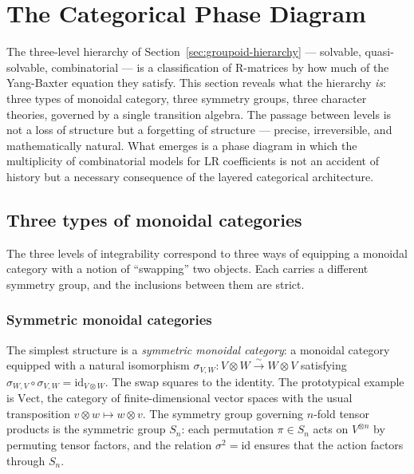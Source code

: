 
\section{The Categorical Phase Diagram}
\label{sec:hierarchy}

The three-level hierarchy of Section~\ref{sec:groupoid-hierarchy}
--- solvable, quasi-solvable, combinatorial --- is a classification
of R-matrices by how much of the Yang-Baxter equation they satisfy.
This section reveals what the hierarchy \emph{is}: three types of
monoidal category, three symmetry groups, three character theories,
governed by a single transition algebra.  The passage between levels
is not a loss of structure but a forgetting of structure --- precise,
irreversible, and mathematically natural.  What emerges is a phase
diagram in which the multiplicity of combinatorial models for LR
coefficients is not an accident of history but a necessary consequence
of the layered categorical architecture.


\subsection{Three types of monoidal categories}
\label{sec:hierarchy-monoidal}

The three levels of integrability correspond to three ways of equipping
a monoidal category with a notion of ``swapping'' two objects.
Each carries a different symmetry group, and the inclusions between
them are strict.

\subsubsection*{Symmetric monoidal categories}

The simplest structure is a \emph{symmetric monoidal category}: a
monoidal category equipped with a natural isomorphism
$\sigma_{V,W} \colon V \otimes W \xrightarrow{\sim} W \otimes V$
satisfying $\sigma_{W,V} \circ \sigma_{V,W} = \mathrm{id}_{V \otimes W}$.
The swap squares to the identity.  The prototypical example is
$\mathrm{Vect}$, the category of finite-dimensional vector spaces
with the usual transposition $v \otimes w \mapsto w \otimes v$.  The
symmetry group governing $n$-fold tensor products is the symmetric
group $S_n$: each permutation $\pi \in S_n$ acts on $V^{\otimes n}$
by permuting tensor factors, and the relation $\sigma^2 = \mathrm{id}$
ensures that the action factors through $S_n$.

